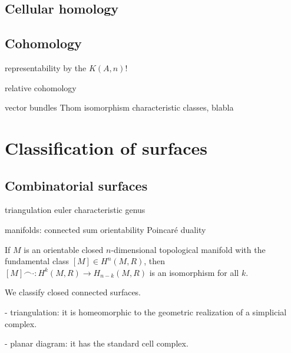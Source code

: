 \documentclass{../../large}
\begin{document}
\section{Cellular homology}




\section{Cohomology}

representability by the $K(A,n)$!



relative cohomology

vector bundles
Thom isomorphism
characteristic classes, blabla




\chapter{Classification of surfaces}
\section{Combinatorial surfaces}



triangulation
euler characteristic
genus


manifolds:
connected sum
orientability
Poincar\'e duality

If $M$ is an orientable closed $n$-dimensional topological manifold with the fundamental class $[M]\in H^n(M,R)$, then $[M]\frown\cdot:H^k(M,R)\to H_{n-k}(M,R)$ is an isomorphism for all $k$.



We classify closed connected surfaces.

- triangulation: it is homeomorphic to the geometric realization of a simplicial complex.

- planar diagram: it has the standard cell complex.
\end{document}
